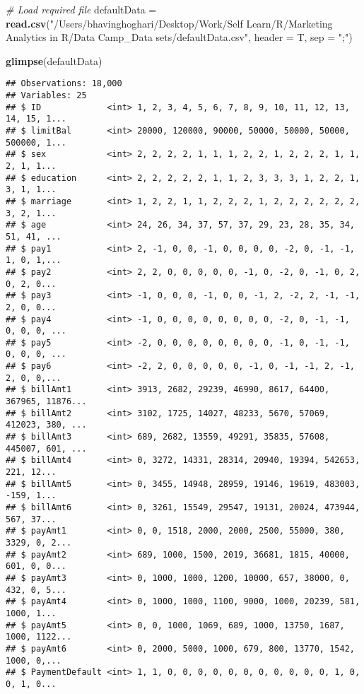 \documentclass[
]{article}
\newenvironment{Shaded}{\begin{snugshade}}{\end{snugshade}}
\newcommand{\CommentTok}[1]{\textcolor[rgb]{0.56,0.35,0.01}{\textit{#1}}}
\newcommand{\DataTypeTok}[1]{\textcolor[rgb]{0.13,0.29,0.53}{#1}}
\newcommand{\KeywordTok}[1]{\textcolor[rgb]{0.13,0.29,0.53}{\textbf{#1}}}
\newcommand{\NormalTok}[1]{#1}
\newcommand{\StringTok}[1]{\textcolor[rgb]{0.31,0.60,0.02}{#1}}
\begin{document}
\begin{Shaded}
\begin{Highlighting}[]
\CommentTok{# Load required file}
\NormalTok{defaultData =}\StringTok{ }\KeywordTok{read.csv}\NormalTok{(}\StringTok{"/Users/bhavinghoghari/Desktop/Work/Self Learn/R/Marketing Analytics in R/Data Camp_Data sets/defaultData.csv"}\NormalTok{, }\DataTypeTok{header =}\NormalTok{ T, }\DataTypeTok{sep =} \StringTok{";"}\NormalTok{)}

\KeywordTok{glimpse}\NormalTok{(defaultData)}
\end{Highlighting}
\end{Shaded}

\begin{verbatim}
## Observations: 18,000
## Variables: 25
## $ ID             <int> 1, 2, 3, 4, 5, 6, 7, 8, 9, 10, 11, 12, 13, 14, 15, 1...
## $ limitBal       <int> 20000, 120000, 90000, 50000, 50000, 50000, 500000, 1...
## $ sex            <int> 2, 2, 2, 2, 1, 1, 1, 2, 2, 1, 2, 2, 2, 1, 1, 2, 1, 1...
## $ education      <int> 2, 2, 2, 2, 2, 1, 1, 2, 3, 3, 3, 1, 2, 2, 1, 3, 1, 1...
## $ marriage       <int> 1, 2, 2, 1, 1, 2, 2, 2, 1, 2, 2, 2, 2, 2, 2, 3, 2, 1...
## $ age            <int> 24, 26, 34, 37, 57, 37, 29, 23, 28, 35, 34, 51, 41, ...
## $ pay1           <int> 2, -1, 0, 0, -1, 0, 0, 0, 0, -2, 0, -1, -1, 1, 0, 1,...
## $ pay2           <int> 2, 2, 0, 0, 0, 0, 0, -1, 0, -2, 0, -1, 0, 2, 0, 2, 0...
## $ pay3           <int> -1, 0, 0, 0, -1, 0, 0, -1, 2, -2, 2, -1, -1, 2, 0, 0...
## $ pay4           <int> -1, 0, 0, 0, 0, 0, 0, 0, 0, -2, 0, -1, -1, 0, 0, 0, ...
## $ pay5           <int> -2, 0, 0, 0, 0, 0, 0, 0, 0, -1, 0, -1, -1, 0, 0, 0, ...
## $ pay6           <int> -2, 2, 0, 0, 0, 0, 0, -1, 0, -1, -1, 2, -1, 2, 0, 0,...
## $ billAmt1       <int> 3913, 2682, 29239, 46990, 8617, 64400, 367965, 11876...
## $ billAmt2       <int> 3102, 1725, 14027, 48233, 5670, 57069, 412023, 380, ...
## $ billAmt3       <int> 689, 2682, 13559, 49291, 35835, 57608, 445007, 601, ...
## $ billAmt4       <int> 0, 3272, 14331, 28314, 20940, 19394, 542653, 221, 12...
## $ billAmt5       <int> 0, 3455, 14948, 28959, 19146, 19619, 483003, -159, 1...
## $ billAmt6       <int> 0, 3261, 15549, 29547, 19131, 20024, 473944, 567, 37...
## $ payAmt1        <int> 0, 0, 1518, 2000, 2000, 2500, 55000, 380, 3329, 0, 2...
## $ payAmt2        <int> 689, 1000, 1500, 2019, 36681, 1815, 40000, 601, 0, 0...
## $ payAmt3        <int> 0, 1000, 1000, 1200, 10000, 657, 38000, 0, 432, 0, 5...
## $ payAmt4        <int> 0, 1000, 1000, 1100, 9000, 1000, 20239, 581, 1000, 1...
## $ payAmt5        <int> 0, 0, 1000, 1069, 689, 1000, 13750, 1687, 1000, 1122...
## $ payAmt6        <int> 0, 2000, 5000, 1000, 679, 800, 13770, 1542, 1000, 0,...
## $ PaymentDefault <int> 1, 1, 0, 0, 0, 0, 0, 0, 0, 0, 0, 0, 0, 1, 0, 0, 1, 0...
\end{verbatim}
\end{document}
